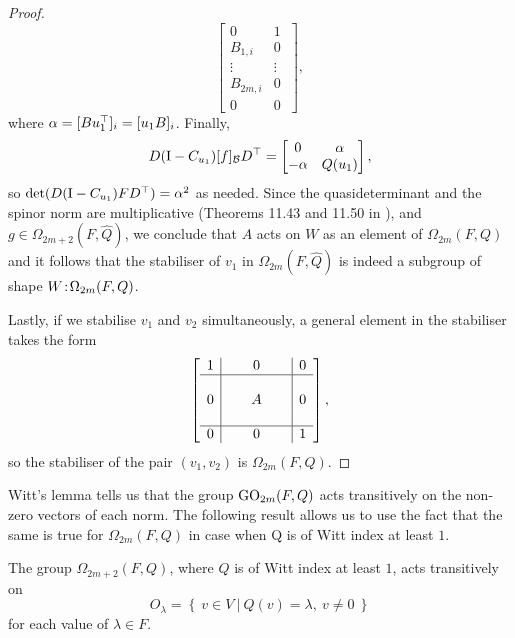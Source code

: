 \begin{proof}
\begin{equation*}
\begin{bmatrix}
	    0 & 1\  \\
	    B_{1,i} & 0\  \\
	    \vdots & \vdots \\
	    B_{2m,i} & 0\  \\
	    0 & 0
	\end{bmatrix},
    \end{equation*}
    where $\alpha = [Bu_1^\top]_i = [u_1B]_i$. Finally, 
    \begin{equation*}
	D(\mathord{\mathrm{I}}-C_{u_1}) [f]_{\mathcal{B}} D^\top = \begin{bmatrix}
	    0 & \alpha \\
	    -\alpha & Q(u_1)
	\end{bmatrix},
    \end{equation*}
    so $\det(D(\mathord{\mathrm{I}}-C_{u_1})FD^\top) = \alpha^2$ as needed. Since the quasideterminant and 
    the spinor norm are multiplicative (Theorems 11.43 and 11.50 in \cite{Taylor}),
    and $g \in \Omega_{2m+2}(F,\hat{Q})$, we conclude that $A$ acts on $W$ as
    an element of $\Omega_{2m}(F,Q)$ and it follows that the stabiliser
    of $v_1$ in $\Omega_{2m}(F,\hat{Q})$ is indeed a subgroup of shape
    $W\mathord{{\;\!{:}\;\!}}\Omega_{2m}(F,Q)$.
    
    Lastly, if we stabilise $v_1$ and $v_2$ simultaneously, a general element in the
    stabiliser takes the form
    \begin{equation*}
	\left[
	    \begin{array}{c|c|c}
		1 & 0 & 0 \\ \hline 
		 & & \\
		0 &\ \ \ \ \ A\ \ \ \ \  & 0 \\ 
		 & & \\ \hline 
		0 & 0 & 1
	    \end{array}
	\right],
    \end{equation*}
    so the stabiliser of the pair $(v_1,v_2)$ is $\Omega_{2m}(F,Q)$. 
\end{proof}

Witt's lemma tells us that the group $\mathrm{GO}_{2m}(F,Q)$ acts transitively 
on the non-zero vectors of each norm. The following result allows us to use the fact
that the same is true for $\Omega_{2m}(F,Q)$ in case when Q is of Witt index at least $1$.

\begin{lemma}
    \label{lemma:A_omega_transitive}
    The group $\Omega_{2m+2}(F,Q)$, where $Q$ is of Witt index at least $1$, 
    acts transitively on
    \begin{equation*}
	O_{\lambda} = \left\{ \  v \in V\ \big|\ Q(v) = \lambda,\ v \neq 0 \ \right\}
    \end{equation*}
    for each value of $\lambda \in F$.
\end{lemma}

